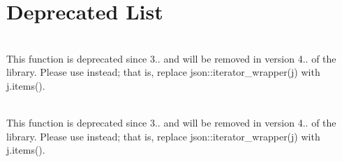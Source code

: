 \chapter{Deprecated List }
\hypertarget{deprecated}{}\label{deprecated}

\begin{DoxyRefList}
\item[{\parbox[t]{\linewidth}{Member \doxylink{classbasic__json_ab8b4e0acdea49e5f0a77abdf1ce465d2}{basic\+\_\+json\texorpdfstring{$<$}{<} Object\+Type, Array\+Type, String\+Type, Boolean\+Type, Number\+Integer\+Type, Number\+Unsigned\+Type, Number\+Float\+Type, Allocator\+Type, JSONSerializer, Binary\+Type, Custom\+Base\+Class \texorpdfstring{$>$}{>}::\+iterator\+\_\+wrapper} (reference ref) noexcept}}]\hfill \\
\label{deprecated__deprecated000001}%
%
This function is deprecated since 3.. and will be removed in version 4.. of the library. Please use  instead; that is, replace {\ttfamily json::\+iterator\+\_\+wrapper(j)} with {\ttfamily j.\+items()}.  
\item[{\parbox[t]{\linewidth}{Member \doxylink{classbasic__json_a7c0314258e5347eade0c6851017bf5a5}{basic\+\_\+json\texorpdfstring{$<$}{<} Object\+Type, Array\+Type, String\+Type, Boolean\+Type, Number\+Integer\+Type, Number\+Unsigned\+Type, Number\+Float\+Type, Allocator\+Type, JSONSerializer, Binary\+Type, Custom\+Base\+Class \texorpdfstring{$>$}{>}::\+iterator\+\_\+wrapper} (\doxylink{classbasic__json_a31370bb451b78198d42c86dd31955deb}{const\+\_\+reference} ref) noexcept}}]\hfill \\
\label{deprecated__deprecated000002}%
%
This function is deprecated since 3.. and will be removed in version 4.. of the library. Please use  instead; that is, replace {\ttfamily json::\+iterator\+\_\+wrapper(j)} with {\ttfamily j.\+items()}.  
\item[{\parbox[t]{\linewidth}{Member \doxylink{classbasic__json_af9907af448f7ff794120033e132025f6}{basic\+\_\+json\texorpdfstring{$<$}{<} Object\+Type, Array\+Type, String\+Type, Boolean\+Type, Number\+Integer\+Type, Number\+Unsigned\+Type, Number\+Float\+Type, Allocator\+Type, JSONSerializer, Binary\+Type, Custom\+Base\+Class \texorpdfstring{$>$}{>}::\+operator\texorpdfstring{$<$}{<}\texorpdfstring{$<$}{<}} (\doxylink{classbasic__json}{basic\+\_\+json} \&j, std::\+istream \&i)}}]\hfill \\

\end{DoxyRefList}
